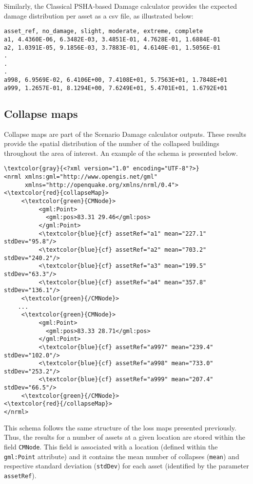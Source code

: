 Similarly, the Classical PSHA-based Damage calculator provides the expected damage distribution per asset as a csv file, as illustrated below:

\begin{Verbatim}[frame=single, commandchars=\\\{\}, samepage=false]
asset_ref, no_damage, slight, moderate, extreme, complete
a1, 4.4360E-06, 6.3482E-03, 3.4851E-01, 4.7628E-01, 1.6884E-01
a2, 1.0391E-05, 9.1856E-03, 3.7883E-01, 4.6140E-01, 1.5056E-01
.
.
.
a998, 6.9569E-02, 6.4106E+00, 7.4108E+01, 5.7563E+01, 1.7848E+01
a999, 1.2657E-01, 8.1294E+00, 7.6249E+01, 5.4701E+01, 1.6792E+01
\end{Verbatim}

\subsection{Collapse maps}
Collapse maps are part of the Scenario Damage calculator outputs. These results provide the spatial distribution of the number of the collapsed buildings throughout the area of interest. An example of the schema is presented below.

\begin{Verbatim}[frame=single, commandchars=\\\{\}, samepage=false]
\textcolor{gray}{<?xml version="1.0" encoding="UTF-8"?>}
<nrml xmlns:gml="http://www.opengis.net/gml"
      xmlns="http://openquake.org/xmlns/nrml/0.4">
<\textcolor{red}{collapseMap}>
     <\textcolor{green}{CMNode}>
          <gml:Point>
            <gml:pos>83.31 29.46</gml:pos>
          </gml:Point>
          <\textcolor{blue}{cf} assetRef="a1" mean="227.1" stdDev="95.8"/>
          <\textcolor{blue}{cf} assetRef="a2" mean="703.2" stdDev="240.2"/>
          <\textcolor{blue}{cf} assetRef="a3" mean="199.5" stdDev="63.3"/>
          <\textcolor{blue}{cf} assetRef="a4" mean="357.8" stdDev="136.1"/>
     <\textcolor{green}{/CMNode}>
    ...
     <\textcolor{green}{CMNode}>
          <gml:Point>
            <gml:pos>83.33 28.71</gml:pos>
          </gml:Point>
          <\textcolor{blue}{cf} assetRef="a997" mean="239.4" stdDev="102.0"/>
          <\textcolor{blue}{cf} assetRef="a998" mean="733.0" stdDev="253.2"/>
          <\textcolor{blue}{cf} assetRef="a999" mean="207.4" stdDev="66.5"/>
     <\textcolor{green}{/CMNode}>
<\textcolor{red}{/collapseMap}>
</nrml>
\end{Verbatim}

This schema follows the same structure of the loss maps presented previously. Thus, the results for a number of \glspl{asset} at a given location are stored within the field \Verb+CMNode+. This field is associated with a location (defined within the \Verb+gml:Point+ attribute) and it contains the mean number of collapses (\Verb+mean+) and respective standard deviation (\Verb+stdDev+) for each \gls{asset} (identified by the parameter \Verb+assetRef+).

